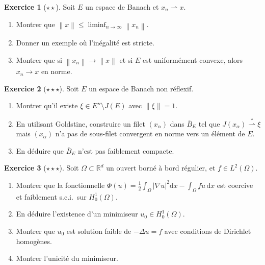 \documentclass[a4paper,12pt]{book}
\newcommand{\R}{\mathbb{R}}
\newcommand{\dd}{\mathrm{d}}
\newcommand{\norm}[1]{\left\| #1 \right\|}
\newcommand{\abs}[1]{\left| #1 \right|}
\newcommand{\weakto}{\rightharpoonup}
\newcommand{\weakstarto}{\overset{*}{\rightharpoonup}}
\theoremstyle{definition}
\newtheorem{exercice}{Exercice}[chapter]
\theoremstyle{plain}
\theoremstyle{remark}
\begin{document}
\begin{exercice}[$\star\star$]
\label{exo:sci-faible-norme}
Soit $E$ un espace de Banach et $x_n \weakto x$.
\begin{enumerate}[label=(\alph*)]
  \item Montrer que $\norm{x} \le \liminf_{n \to \infty} \norm{x_n}$.
  \item Donner un exemple où l'inégalité est stricte.
  \item Montrer que si $\norm{x_n} \to \norm{x}$ et si $E$ est uniformément convexe,
    alors $x_n \to x$ en norme.
\end{enumerate}
\end{exercice}

\begin{exercice}[$\star\star\star$]
\label{exo:goldstine-application}
Soit $E$ un espace de Banach non réflexif.
\begin{enumerate}[label=(\alph*)]
  \item Montrer qu'il existe $\xi \in E'' \setminus J(E)$ avec $\norm{\xi} = 1$.
  \item En utilisant Goldstine, construire un filet $(x_\alpha)$ dans $\overline{B}_E$
    tel que $J(x_\alpha) \weakstarto \xi$ mais $(x_\alpha)$ n'a pas de sous-filet
    convergent en norme vers un élément de $E$.
  \item En déduire que $\overline{B}_E$ n'est pas faiblement compacte.
\end{enumerate}
\end{exercice}

\begin{exercice}[$\star\star\star$]
\label{exo:minimisation-edp}
Soit $\Omega \subset \R^d$ un ouvert borné à bord régulier, et $f \in L^2(\Omega)$.
\begin{enumerate}[label=(\alph*)]
  \item Montrer que la fonctionnelle
    $\Phi(u) = \frac{1}{2}\int_\Omega \abs{\nabla u}^2 \dd x - \int_\Omega f u \, \dd x$
    est coercive et faiblement s.c.i.\ sur $H_0^1(\Omega)$.
  \item En déduire l'existence d'un minimiseur $u_0 \in H_0^1(\Omega)$.
  \item Montrer que $u_0$ est solution faible de $-\Delta u = f$ avec conditions
    de Dirichlet homogènes.
  \item Montrer l'unicité du minimiseur.
\end{enumerate}
\end{exercice}
\end{document}
